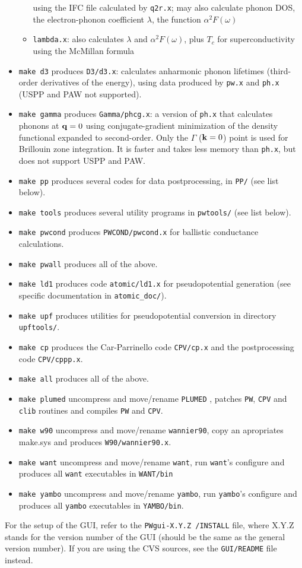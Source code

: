 \documentclass[12pt,a4paper]{article}
\def\pw.x{\texttt{pw.x}}
\def\ph.x{\texttt{ph.x}}
\begin{document}
\begin{itemize}
\begin{itemize}
    using the IFC file calculated by \texttt{q2r.x}; may also calculate phonon DOS, 
    the electron-phonon coefficient $\lambda$, the function $\alpha^2F(\omega)$
\item \texttt{lambda.x}: also calculates $\lambda$ and $\alpha^2F(\omega)$,
   plus $T_c$ for  superconductivity using the McMillan formula
  \end{itemize}
\item \texttt{make d3} produces \texttt{D3/d3.x}:
  calculates anharmonic phonon lifetimes (third-order derivatives
  of the energy), using data produced by \pw.x and \ph.x (USPP 
  and PAW not supported). 
\item \texttt{make gamma} produces \texttt{Gamma/phcg.x}: 
  a version of \ph.x that calculates phonons at ${\bf q} = 0$ using
  conjugate-gradient minimization of the density functional expanded to
  second-order. Only the $\Gamma$ (${\bf k} = 0$) point is used for Brillouin zone
  integration. It is faster and takes less memory than \ph.x, but does
  not support USPP and PAW.
\item  \texttt{make pp} produces several codes for data postprocessing, in 
  \texttt{PP/}  (see list below). 
\item \texttt{make tools} produces several utility programs in \texttt{pwtools/} (see
  list below).  
\item \texttt{make pwcond} produces \texttt{PWCOND/pwcond.x}
 for ballistic conductance calculations.
\item \texttt{make pwall} produces all of the above.
\item \texttt{make ld1} produces code \texttt{atomic/ld1.x} for pseudopotential
generation (see specific documentation in \texttt{atomic\_doc/}).
\item \texttt{make upf} produces utilities for pseudopotential conversion in
  directory \texttt{upftools/}.
\item \texttt{make cp} produces the Car-Parrinello code \texttt{CPV/cp.x}
  and the postprocessing code \texttt{CPV/cppp.x}. 
\item \texttt{make all} produces all of the above.
\item \texttt{make plumed} uncompress and move/rename \texttt{PLUMED} , patches \texttt{PW},
\texttt{CPV} and \texttt{clib} routines and compiles \texttt{PW} and \texttt{CPV}.
\item \texttt{make w90} uncompress and move/rename \texttt{wannier90}, copy an apropriates
make.sys and produces \texttt{W90/wannier90.x}.
\item \texttt{make want} uncompress and move/rename \texttt{want}, run \texttt{want}'s configure
and produces all \texttt{want} executables in \texttt{WANT/bin}
\item \texttt{make yambo} uncompress and move/rename \texttt{yambo}, run \texttt{yambo}'s configure
and produces all \texttt{yambo} executables in \texttt{YAMBO/bin}.
\end{itemize}
For the setup of the GUI, refer to the \texttt{PWgui-X.Y.Z /INSTALL} file, where
X.Y.Z stands for the version number of the GUI (should be the same as the
general version number). If you are using the CVS sources, see
the \texttt{GUI/README} file instead.
   
\end{document}
